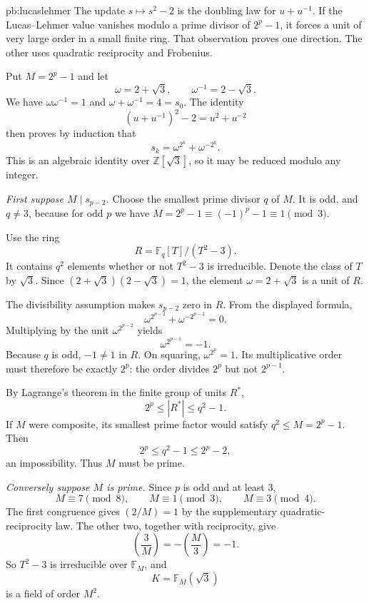 \begin{solution}{pb:lucaslehmer}
\idea The update $s\mapsto s^2-2$ is the doubling law for $u+u^{-1}$. If the Lucas--Lehmer value vanishes modulo a prime divisor of $2^p-1$, it forces a unit of very large order in a small finite ring. That observation proves one direction. The other uses quadratic reciprocity and Frobenius.

\writeup Put $M=2^p-1$ and let
\[
\omega=2+\sqrt3,\qquad
\omega^{-1}=2-\sqrt3.
\]
We have $\omega\omega^{-1}=1$ and $\omega+\omega^{-1}=4=s_0$. The identity
\[
(u+u^{-1})^2-2=u^2+u^{-2}
\]
then proves by induction that
\[
\boxed{s_k=\omega^{2^k}+\omega^{-2^k}}.
\]
This is an algebraic identity over $\mathbb Z[\sqrt3]$, so it may be reduced modulo any integer.

\emph{First suppose $M\mid s_{p-2}$.}
Choose the smallest prime divisor $q$ of $M$. It is odd, and $q\ne3$, because for odd $p$ we have $M=2^p-1\equiv(-1)^p-1\equiv1\pmod3$.

Use the ring
\[
R=\mathbb F_q[T]/(T^2-3).
\]
It contains $q^2$ elements whether or not $T^2-3$ is irreducible. Denote the class of $T$ by $\sqrt3$. Since $(2+\sqrt3)(2-\sqrt3)=1$, the element $\omega=2+\sqrt3$ is a unit of $R$.

The divisibility assumption makes $s_{p-2}$ zero in $R$. From the displayed formula,
\[
\omega^{2^{p-2}}+\omega^{-2^{p-2}}=0.
\]
Multiplying by the unit $\omega^{2^{p-2}}$ yields
\[
\omega^{2^{p-1}}=-1.
\]
Because $q$ is odd, $-1\ne1$ in $R$. On squaring, $\omega^{2^p}=1$. Its multiplicative order must therefore be exactly $2^p$: the order divides $2^p$ but not $2^{p-1}$.

By Lagrange's theorem in the finite group of units $R^*$,
\[
2^p\le |R^*|\le q^2-1.
\]
If $M$ were composite, its smallest prime factor would satisfy $q^2\le M=2^p-1$. Then
\[
2^p\le q^2-1\le2^p-2,
\]
an impossibility. Thus $M$ must be prime.

\emph{Conversely suppose $M$ is prime.}
Since $p$ is odd and at least $3$,
\[
M\equiv7\pmod8,\qquad
M\equiv1\pmod3,\qquad
M\equiv3\pmod4.
\]
The first congruence gives $(2/M)=1$ by the supplementary quadratic-reciprocity law. The other two, together with reciprocity, give
\[
\left(\frac3M\right)=-\left(\frac M3\right)=-1.
\]
So $T^2-3$ is irreducible over $\mathbb F_M$, and
\[
K=\mathbb F_M(\sqrt3)
\]
is a field of order $M^2$.


\end{solution}
